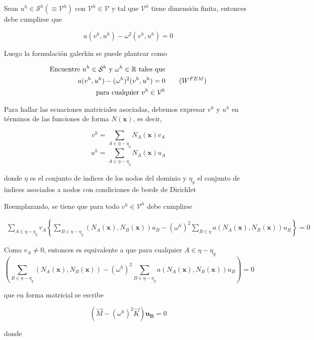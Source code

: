 Sean $u^h \in \mathcal{S}^h \left( \equiv \mathcal{V}^h \right)$ con $\mathcal{V}^h \in \mathcal{V}$ y tal que $\mathcal{V}^h$ tiene dimensi\'on finita, entonces debe cumplirse que 

$$ a(v^h, u^h) - \omega^2 (v^h, u^h) = 0 $$

Luego la formulaci\'on galerkin se puede plantear como

\begin{equation}
  \begin{split}
  \text{Encuentre $u^h\in\mathcal{S}^h$ y $\omega^h \in \mathbb{R}$  tales que} \\
    a(v^h,u^h) - (\omega^h)^2 (v^h,u^h) = 0 \\
    \text{ para cualquier $v^h \in \mathcal{V}^h$}
  \end{split}
  \tag{\text{$W^{FEM}$}}
\end{equation}


Para hallar las ecuaciones matriciales asociadas, debemos expresar $v^h$ y $u^h$ en t\'erminos de las funciones de forma $N(\boldsymbol{x})$, es decir, 

$$v^h = \sum_{A \in \eta-\eta_g}N_A(\boldsymbol{x})v_A$$
$$u^h = \sum_{A \in \eta-\eta_g}N_A(\boldsymbol{x})u_A$$

donde 
$\eta$ es el conjunto de \'indices de los  nodos del dominio y $\eta_g$ el conjunto de \'indices asociados a nodos con condiciones de borde de Dirichlet

Reemplazando, se tiene que para todo $ v^h\in \mathcal{V}^h$ debe cumplirse

\begin{equation*}
\begin{split}
\sum_{A \in \eta-\eta_g} v_A 
\left \{
\sum_{B \in \eta-\eta_g}(N_A(\boldsymbol{x}), N_B(\boldsymbol{x})) u_B - 
(\omega^h)^2 \sum_{B \in \eta} a(N_A(\boldsymbol{x}), N_B(\boldsymbol{x})) u_B 
\right \} = 0
\end{split}
\end{equation*}

Como $v_A \neq 0$, entonces es equivalente a que para cualquier $A\in \eta-\eta_g$
$$\left( \sum_{B \in \eta-\eta_g}(N_A(\boldsymbol{x}), N_B(\boldsymbol{x})) - 
(\omega^h)^2 \sum_{B \in \eta-\eta_g} a(N_A(\boldsymbol{x}), N_B(\boldsymbol{x})) u_B\right) =0 $$

que en forma matricial se escribe 

$$(\vec M - (\omega^h)^2 \vec K)\boldsymbol{u_B} = 0$$

donde 

